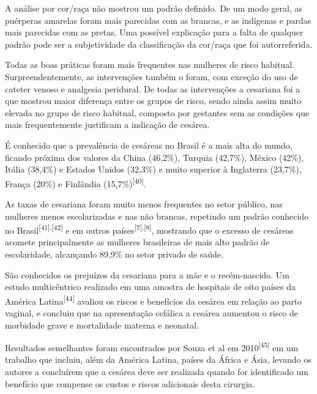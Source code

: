 \documentclass{article}
\begin{document}
A análise por cor/raça não mostrou um padrão definido. De um modo geral, as
puérperas
amarelas foram mais parecidas com as brancas, e as indígenas e pardas mais
parecidas
com as pretas. Uma possível explicação para a falta de qualquer padrão pode ser
a
subjetividade da classificação da cor/raça que foi autorreferida.

Todas as boas práticas foram mais frequentes nas mulheres de risco habitual.
Surpreendentemente, as intervenções também o foram, com exceção do uso de
cateter
venoso e analgesia peridural. De todas as intervenções a cesariana foi a que
mostrou
maior diferença entre os grupos de risco, sendo ainda assim muito elevada no
grupo
de risco habitual, composto por gestantes sem as condições que mais
frequentemente
justificam a indicação de cesárea.

É conhecido que a prevalência de cesáreas no Brasil é a mais alta do mundo,
ficando
próxima dos valores da China (46,2\%), Turquia (42,7\%), México (42\%), Itália
(38,4\%)
e Estados Unidos (32,3\%) e muito superior à Inglaterra (23,7\%), França (20\%)
e
Finlândia (15,7\%)\textsuperscript{[}\textsuperscript{40}\textsuperscript{]}.

As taxas de cesariana foram muito menos frequentes no setor público, nas
mulheres
menos escolarizadas e nas não brancas, repetindo um padrão conhecido no Brasil\textsuperscript{[}\textsuperscript{41}\textsuperscript{]}\textsuperscript{,}\textsuperscript{[}\textsuperscript{42}\textsuperscript{]}
e em outros países\textsuperscript{[}\textsuperscript{7}\textsuperscript{]}\textsuperscript{,}\textsuperscript{[}\textsuperscript{8}\textsuperscript{]}, mostrando que o excesso de cesáreas acomete principalmente
as mulheres brasileiras de mais alto padrão de escolaridade, alcançando 89,9\%
no
setor privado de saúde.

São conhecidos os prejuízos da cesariana para a mãe e o recém-nascido. Um estudo
multicêntrico realizado em uma amostra de hospitais de oito países da América
Latina\textsuperscript{[}\textsuperscript{44}\textsuperscript{]}
avaliou os riscos e
benefícios da cesárea em relação ao parto vaginal, e concluiu que na
apresentação
cefálica a cesárea aumentou o risco de morbidade grave e mortalidade materna e
neonatal.

Resultados semelhantes foram encontrados por Souza et al em 2010\textsuperscript{[}\textsuperscript{45}\textsuperscript{]}
em um trabalho que incluiu, além
da América Latina, países da África e Ásia, levando os autores a concluírem que
a
cesárea deve ser realizada quando for identificado um benefício que compense os
custos e riscos adicionais desta cirurgia.
\end{document}
